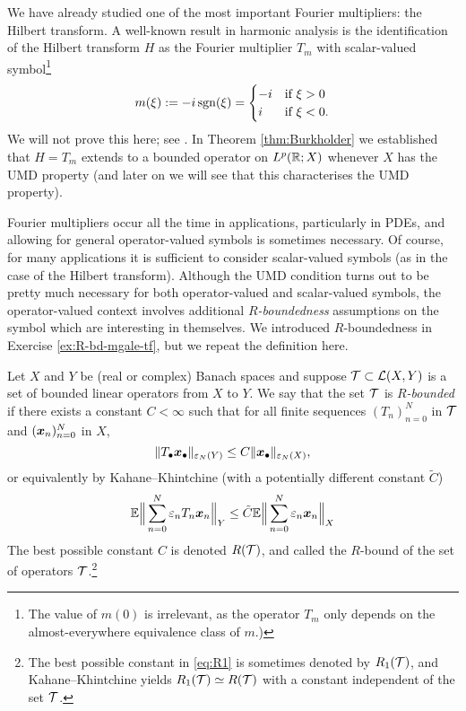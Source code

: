 We have already studied one of the most important Fourier multipliers: the Hilbert transform.
A well-known result in harmonic analysis is the identification of the Hilbert transform $H$ as the Fourier multiplier $T_{m}$ with scalar-valued symbol\footnote{The value of $m(0)$ is irrelevant, as the operator $T_{m}$ only depends on the almost-everywhere equivalence class of $m$.)}
\begin{equation*}
  m(\xi) := -i\operatorname{sgn}(\xi) =
  \begin{cases}
    -i &\text{if $\xi > 0$} \\
    i &\text{if $\xi < 0$.}
  \end{cases}
\end{equation*}
We will not prove this here; see \cite[Proposition 5.2.2]{HNVW16}.
In Theorem \ref{thm:Burkholder} we established that $H = T_{m}$ extends to a bounded operator on $L^p(\mathbb{R};X)$ whenever $X$ has the UMD property (and later on we will see that this characterises the UMD property).

Fourier multipliers occur all the time in applications, particularly in PDEs, and allowing for general operator-valued symbols is sometimes necessary.
Of course, for many applications it is sufficient to consider scalar-valued symbols (as in the case of the Hilbert transform).
Although the UMD condition turns out to be pretty much necessary for both operator-valued and scalar-valued symbols, the operator-valued context involves additional \emph{$R$-boundedness} assumptions on the symbol which are interesting in themselves.
We introduced $R$-boundedness in Exercise \ref{ex:R-bd-mgale-tf}, but we repeat the definition here. 

\begin{defn}
  Let $X$ and $Y$ be (real or complex) Banach spaces and suppose $\mathcal{T} \subset \mathcal{L}(X,Y)$ is a set of bounded linear operators from $X$ to $Y$.
We say that the set $\mathcal{T}$ is \emph{$R$-bounded} if there exists a constant $C < \infty$ such that for all finite sequences $(T_{n})_{n=0}^{N}$ in $\mathcal{T}$ and $(\bm{x}_{n})_{n=0}^{N}$ in $X$,
\begin{equation*}
  \|T_{\bullet} \bm{x}_{\bullet}\|_{\varepsilon_{N}(Y)} \leq C \|\bm{x}_{\bullet}\|_{\varepsilon_{N}(X)},
\end{equation*}
or equivalently by Kahane--Khintchine (with a potentially different constant $\tilde{C}$)
\begin{equation}\label{eq:R1}
  \mathbb{E} \Big\| \sum_{n=0}^{N} \varepsilon_{n} T_{n} \bm{x}_{n} \Big\|_{Y} \leq \tilde{C} \mathbb{E} \Big\| \sum_{n=0}^{N} \varepsilon_{n}  \bm{x}_{n} \Big\|_{X}
\end{equation}
The best possible constant $C$ is denoted $R(\mathcal{T})$, and called the $R$-bound of the set of operators $\mathcal{T}$.\footnote{The best possible constant in \eqref{eq:R1} is sometimes denoted by $R_{1}(\mathcal{T})$, and Kahane--Khintchine yields $R_{1}(\mathcal{T}) \simeq R(\mathcal{T})$ with a constant independent of the set $\mathcal{T}$.}
\end{defn}

